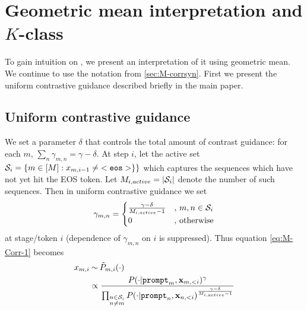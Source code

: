 \section{Geometric mean interpretation and $K$-class \corrsyn{}}
\label{sec:geometric}
To gain intuition on \corrsyn{}, we present an interpretation of it using geometric mean. We continue to use the notation from \ref{sec:M-corrsyn}. First we present the uniform contrastive guidance described briefly in the main paper.

\subsection{Uniform contrastive guidance}

\label{sec:app_unif_guidance}
We set a parameter $\delta$ that controls the total amount of contrast guidance: for each $m$, $\sum_n \gamma_{m,n}=\gamma-\delta$. 
At step $i$, let the active set $\mathcal{S}_{i}=\{m\in[M]:x_{m,i-1}\neq \mathtt{<eos>}\}\}$ which captures the sequences which have not yet hit the EOS token. Let $M_{i,active}=|\mathcal{S}_{i}|$ denote the number of such sequences. Then in uniform contrastive guidance we set 
$$\gamma_{m,n}=\begin{cases} \frac{\gamma-\delta}{M_{i,active}-1}&,\, m,n\in\mathcal{S}_i\\
 0&,\, \mathrm{otherwise}\end{cases}$$
at stage/token $i$ (dependence of $\gamma_{m,n}$ on $i$ is suppressed). 
Thus equation \eqref{eq:M-Corr-1} becomes
\begin{align}
    x_{m,i}&\mathbin{\overset{}{\kern0pt\sim}} \tilde {P}_{m,i}(\cdot)\nonumber\\
    &\propto \frac{P(\cdot| \mathtt{prompt}_m,\mathbf{x}_{m,<i})^{\gamma}}{\prod_{\substack{n\in \mathcal{S}_i \\n\neq  m}}P(\cdot| \mathtt{prompt}_n,\mathbf{x}_{n,<i})^{\frac{\gamma-\delta}{M_{i,active}-1}}}\label{eq:M-Corr-2}
\end{align}

